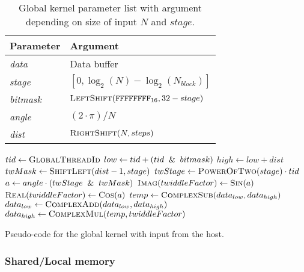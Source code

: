 \begin{table}
	\centering
	\begin{tabular}{|l|l|}
		\hline
		Parameter & Argument \\ \hline
		\textit{data} & Data buffer \\ \hline
		\textit{stage} & $[0,\log_{2}(N) - \log_{2}(N_{block})]$ \\ \hline
		\textit{bitmask} & $\Call{LeftShift}{\texttt{FFFFFFFF}_{16}, 32 - stage}$ \\ \hline
		\textit{angle} & $(2 \cdot \pi)/N$ \\ \hline
		\textit{dist} & $\Call{RightShift}{N, steps}$ \\ \hline		
	\end{tabular}
	\caption{Global kernel parameter list with argument depending on size of input $N$ and $stage$.}
	\label{tab:global-kernel}
\end{table}

\begin{algorithm}
	\centering
	\begin{algorithmic}[1]
            \State $tid \gets \Call{GlobalThreadId}{}$ 
            \State $low \gets tid + (tid \And bitmask)$
            \State $high \gets low + dist$
            \newline
            \State $twMask \gets \Call{ShiftLeft}{dist - 1, stage}$
            \State $twStage \gets \Call{PowerOfTwo}{stage} \cdot tid$
            \State $a \gets angle \cdot (twStage \And twMask)$
            \State $\Call{Imag}{twiddleFactor} \gets \Call{Sin}{a}$
            \State $\Call{Real}{twiddleFactor} \gets \Call{Cos}{a}$
            \newline
            \State $temp \gets \Call{ComplexSub}{data_{low}, data_{high}}$
            \State $data_{low} \gets \Call{ComplexAdd}{data_{low}, data_{high}}$
            \State $data_{high} \gets \Call{ComplexMul}{temp, twiddleFactor}$
        \EndProcedure
	\end{algorithmic}
	\caption{Pseudo-code for the global kernel with input from the host.}
	\label{alg:device:global-kernel}
\end{algorithm}

\subsubsection{Shared/Local memory}

